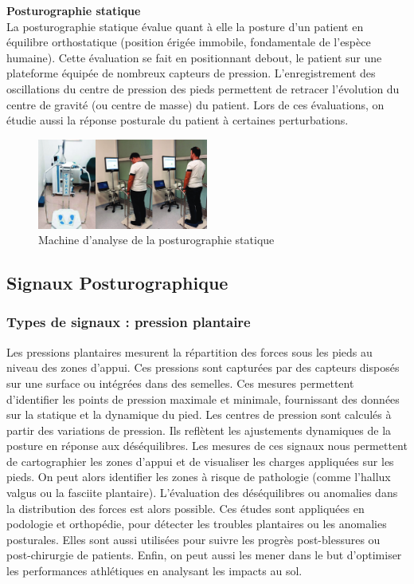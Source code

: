\textbf{Posturographie statique}\\
La posturographie statique évalue quant à elle la posture d’un patient en équilibre orthostatique (position érigée immobile, fondamentale de l'espèce humaine). Cette évaluation se fait en positionnant debout, le patient sur une plateforme équipée de nombreux capteurs de pression. L’enregistrement des oscillations du centre de pression des pieds permettent de retracer l'évolution du centre de gravité (ou centre de masse) du patient. Lors de ces évaluations, on étudie aussi la réponse posturale du patient à certaines perturbations.\\
\begin{figure}[H]                                                                                                                                                                                                             
  \centering
  \includegraphics[width=0.5\textwidth]{images/introduction/statique.png}
  \caption{Machine d’analyse de la posturographie statique }
  \label{fig:posturographie-statique}
\end{figure}

\subsection{Signaux Posturographique}


\subsubsection{Types de signaux : pression plantaire}

Les pressions plantaires mesurent la répartition des forces sous les pieds au 
niveau des zones d’appui. Ces pressions sont capturées par des capteurs disposés 
sur une surface ou intégrées dans des semelles. Ces mesures permettent 
d’identifier les points de pression maximale et minimale, fournissant des données 
sur la statique et la dynamique du pied. Les centres de pression sont calculés à 
partir des variations de pression. Ils reflètent les ajustements dynamiques de la 
posture en réponse aux déséquilibres. Les mesures de ces signaux nous permettent 
de cartographier les zones d'appui et de visualiser les charges appliquées sur les
pieds. On peut alors identifier les zones à risque de pathologie (comme l’hallux 
valgus ou la fasciite plantaire). L'évaluation des déséquilibres ou anomalies dans 
la distribution des forces est alors possible. Ces études sont appliquées en 
podologie et orthopédie, pour détecter les troubles plantaires ou les anomalies 
posturales. Elles sont aussi utilisées pour suivre les progrès post-blessures ou 
post-chirurgie de patients. Enfin, on peut aussi les mener dans le but d’optimiser 
les performances athlétiques en analysant les impacts au sol.


